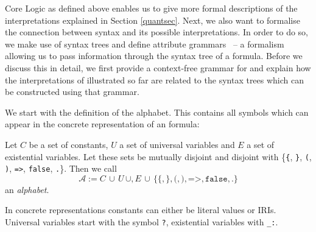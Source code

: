 \nthree Core Logic as defined above enables us to give more formal descriptions of the \nthree interpretations explained in Section \ref{quantsec}.
Next, we also want to formalise the connection between \nthree syntax and its possible interpretations. In order to do so, we make use of syntax trees and define attribute 
grammars~\cite{attributegrammar,ag2} -- a formalism allowing us to pass information through the syntax tree of a formula.
Before we discuss this in detail, we first provide a context-free grammar for \nthree and explain how 
the interpretations of \nthree illustrated so far are related to the syntax trees which can be constructed using that grammar.

% 

We start with the definition of the
alphabet. This contains all symbols which can appear in the concrete representation of an \nthree formula:
\begin{definition} \label{alphabet}
Let $C$ be a set of constants, $U$ a set of universal variables and $E$ a set of existential variables. Let these sets be mutually disjoint and disjoint 
with \{\texttt{\{}, \texttt{\}}, \texttt{(}, \texttt{)}, \texttt{=>}, \texttt{false}, \texttt{.}\}.
Then we call
\[\mathcal{A}:=C \,\cup\, U \,\cup, E \,\cup\, \{\texttt{\{}, \texttt{\}}, \texttt{(}, \texttt{)}, \texttt{=>}, \texttt{false}, \texttt{.}\}\] an \emph{\nthree alphabet}. 
\end{definition}
%
In concrete representations constants can either be literal values or IRIs.
Universal variables start with the symbol \texttt{?}, existential variables with \texttt{\_:}. %

